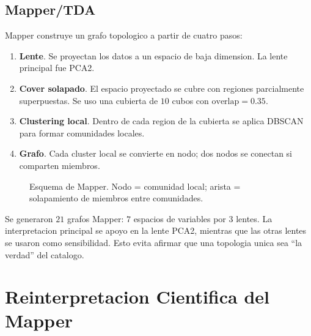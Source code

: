 \documentclass[11pt]{article}
\begin{document}
\subsection{Mapper/TDA}

Mapper construye un grafo topologico a partir de cuatro pasos:
\begin{enumerate}
  \item \textbf{Lente}. Se proyectan los datos a un espacio de baja dimension. La lente principal fue PCA2.
  \item \textbf{Cover solapado}. El espacio proyectado se cubre con regiones parcialmente superpuestas. Se uso una cubierta de \(10\) cubos con \(\mathrm{overlap}=0.35\).
  \item \textbf{Clustering local}. Dentro de cada region de la cubierta se aplica DBSCAN para formar comunidades locales.
  \item \textbf{Grafo}. Cada cluster local se convierte en nodo; dos nodos se conectan si comparten miembros.
\end{enumerate}

\begin{figure}[H]
\centering
{}
\caption{Esquema de Mapper. Nodo = comunidad local; arista = solapamiento de miembros entre comunidades.}
\end{figure}

Se generaron \(21\) grafos Mapper: \(7\) espacios de variables por \(3\) lentes. La interpretacion principal se apoyo en la lente PCA2, mientras que las otras lentes se usaron como sensibilidad. Esto evita afirmar que una topologia unica sea ``la verdad'' del catalogo.

\section{Reinterpretacion Cientifica del Mapper}
\end{document}
